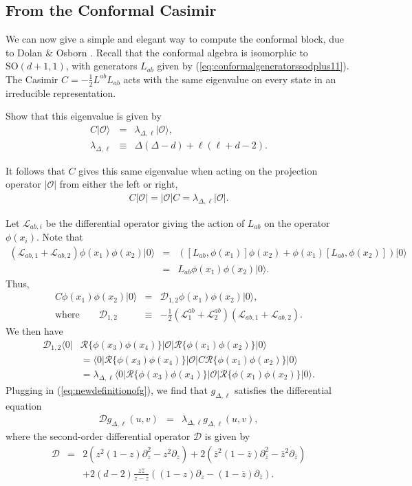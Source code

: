 \documentclass[12pt]{article}
\numberwithin{equation}{section}
\newcommand\be{\begin{eqnarray}}
\newcommand\ee{\end{eqnarray}}
\newcommand\f\phi
\newcommand\cO{\mathcal{O}}
\newcommand\p[1]{\left(#1\right)}
\newcommand\ptl\partial
\newcommand\<\langle
\renewcommand\>\rangle
\newcommand\nn{\nonumber}
\renewcommand\.{\cdot}
\newcommand\SO{\mathrm{SO}}
\newcommand\De{\Delta}
\renewcommand\l\lambda
\newcommand\cL{\mathcal{L}}
\newcommand\cD{\mathcal{D}}
\begin{document}
\subsection{From the Conformal Casimir}

We can now give a simple and elegant way to compute the conformal block, due to Dolan \& Osborn \cite{DO2}.
Recall that the conformal algebra is isomorphic to $\SO(d+1,1)$, with generators $L_{ab}$ given by (\ref{eq:conformalgeneratorssodplus11}).  The Casimir $C=-\frac 1 2 L^{ab}L_{ab}$ acts with the same eigenvalue on every state in an irreducible representation.  

Show that this eigenvalue is given by
\be
C|\cO\> &=& \l_{\De,\ell}|\cO\>,\nn\\
\l_{\De,\ell} &\equiv& \De(\De-d)+\ell(\ell+d-2).
\ee

It follows that $C$ gives this same eigenvalue when acting on the projection operator $|\cO|$ from either the left or right,
\be
C|\cO|=|\cO| C = \l_{\De,\ell}|\cO|.
\ee

Let $\cL_{ab,i}$ be the differential operator giving the action of $L_{ab}$ on the operator $\f(x_i)$.  Note that
\be
(\cL_{ab,1}+\cL_{ab,2})\f(x_1)\f(x_2)|0\> &=& \p{[L_{ab},\f(x_1)]\f(x_2)+\f(x_1)[L_{ab},\f(x_2)]}|0\>\nn\\
&=& L_{ab}\f(x_1)\f(x_2)|0\>.
\ee
Thus, 
\be
C\f(x_1)\f(x_2)|0\> &=& \cD_{1,2}\f(x_1)\f(x_2)|0\>,\nn\\
\textrm{where}\qquad\cD_{1,2} &\equiv& -\frac 1 2(\cL^{ab}_{1}+\cL^{ab}_{2})(\cL_{ab,1}+\cL_{ab,2}).
\ee
We then have
\begin{align}
\cD_{1,2}\<0|&\mathcal{R}\{\f(x_3)\f(x_4)\}|\cO|\mathcal{R}\{\f(x_1)\f(x_2)\}|0\>\nn\\
&=
\<0|\mathcal{R}\{\f(x_3)\f(x_4)\}|\cO| C\mathcal{R}\{\f(x_1)\f(x_2)\}|0\>\nn\\
&= \l_{\De,\ell}\<0|\mathcal{R}\{\f(x_3)\f(x_4)\}|\cO|\mathcal{R}\{\f(x_1)\f(x_2)\}|0\>.
\end{align}
Plugging in (\ref{eq:newdefinitionofg}), we find that $g_{\De,\ell}$ satisfies the differential equation 
\be
\label{eq:conformalcasimir}
\cD g_{\De,\ell}(u,v) &=& \l_{\De,\ell} g_{\De,\ell}(u,v),
\ee
where the second-order differential operator $\cD$ is given by
\be
\cD &=& 2(z^2(1-z)\ptl_z^2-z^2 \ptl_z) + 2(\bar z^2 (1-\bar z)\ptl_{\bar z}^2-\bar z^2 \ptl_{\bar z})\nn\\
&& + 2(d-2)\frac{z\bar z}{z-\bar z}((1-z)\ptl_z - (1-\bar z)\ptl_{\bar z}).
\ee
\end{document}
